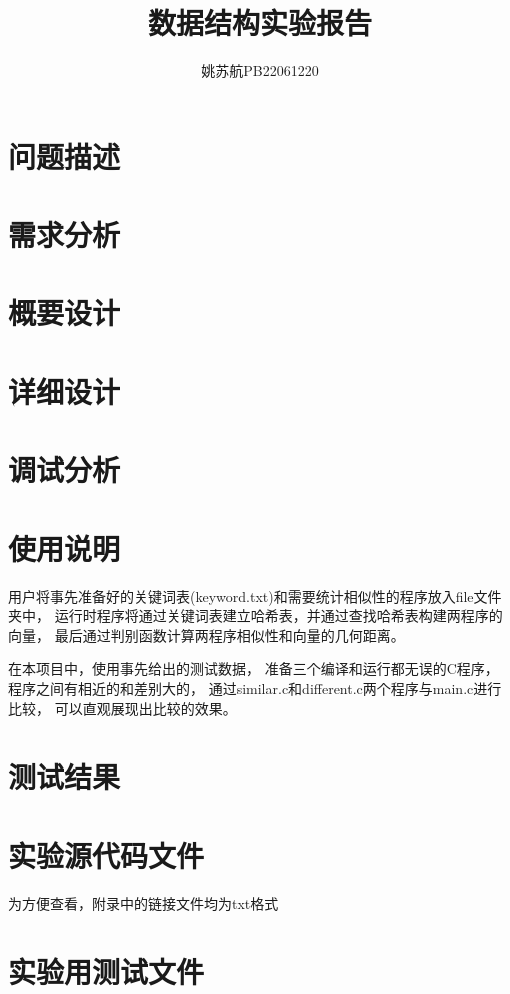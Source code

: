 \documentclass[a4paper]{article}
\title{\textbf{数据结构实验报告}}
\author{姚苏航\qquad PB22061220}
\date{}
\begin{document}
	\maketitle


	\section{问题描述}\label{sec:des}
	


	\section{需求分析}\label{sec:need}
	


	\section{概要设计}\label{sec:design1}
	


	\section{详细设计}\label{sec:design2}
	


	\section{调试分析}\label{sec:debug}
	


	\section{使用说明}\label{sec:instrut}
	{{用户将事先准备好的关键词表(keyword.txt)和需要统计相似性的程序放入file文件夹中，
	运行时程序将通过关键词表建立哈希表，并通过查找哈希表构建两程序的向量，
	最后通过判别函数计算两程序相似性和向量的几何距离。}}

	{{在本项目中，使用事先给出的测试数据，
	准备三个编译和运行都无误的C程序，程序之间有相近的和差别大的，
	通过similar.c和different.c两个程序与main.c进行比较，
	可以直观展现出比较的效果。}}


	\section{测试结果}\label{sec:result}
	


	\section{实验源代码文件}\label{sec:appendix1}
	{{为方便查看，附录中的链接文件均为txt格式}}
	


	\section{实验用测试文件}\label{sec:appendix2}
	
\end{document}
